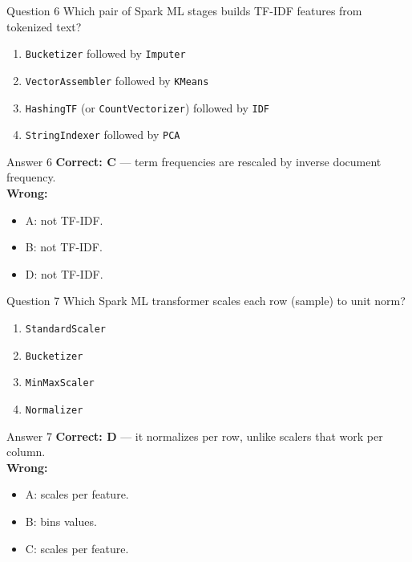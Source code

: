 \documentclass[aspectratio=169,11pt]{beamer}
\begin{document}
\begin{frame}{Question 6}
Which pair of Spark ML stages builds TF-IDF features from tokenized text?
\begin{enumerate}[label=\Alph*.]
\item \texttt{Bucketizer} followed by \texttt{Imputer}
\item \texttt{VectorAssembler} followed by \texttt{KMeans}
\item \texttt{HashingTF} (or \texttt{CountVectorizer}) followed by \texttt{IDF}
\item \texttt{StringIndexer} followed by \texttt{PCA}
\end{enumerate}
\end{frame}
\begin{frame}{Answer 6}
\textbf{Correct: C} --- term frequencies are rescaled by inverse document frequency.\\
\vspace{0.5em}
\textbf{Wrong:}
\begin{itemize}
\item A: not TF-IDF.
\item B: not TF-IDF.
\item D: not TF-IDF.
\end{itemize}
\end{frame}

\begin{frame}{Question 7}
Which Spark ML transformer scales each row (sample) to unit norm?
\begin{enumerate}[label=\Alph*.]
\item \texttt{StandardScaler}
\item \texttt{Bucketizer}
\item \texttt{MinMaxScaler}
\item \texttt{Normalizer}
\end{enumerate}
\end{frame}
\begin{frame}{Answer 7}
\textbf{Correct: D} --- it normalizes per row, unlike scalers that work per column.\\
\vspace{0.5em}
\textbf{Wrong:}
\begin{itemize}
\item A: scales per feature.
\item B: bins values.
\item C: scales per feature.
\end{itemize}
\end{frame}
\end{document}
